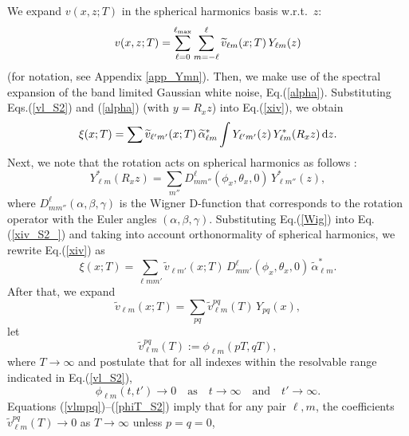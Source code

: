 \documentclass[12pt]{article}
\renewcommand{\d}{{\rm d}}
\newcommand{\wrt}{w.r.t.\ }
\begin{document}
We expand $v(x,z;T)$ in the spherical harmonics basis \wrt $z$:
%
\begin {equation}
\label{vl_S2}
v(x,z;T) = \sum^{\ell_{\rm max}}_{\ell=0} \sum^\ell_{m=-\ell} \widetilde v_{\ell m}(x;T) \, Y_{\ell m} (z)
\end {equation}
%
(for notation, see Appendix \ref{app_Ymn}).
Then, we make use of the spectral expansion of the
band limited Gaussian white noise, Eq.(\ref{alpha}).
Substituting  Eqs.(\ref{vl_S2}) and (\ref{alpha}) (with $y=R_x z$) into Eq.(\ref{xiv}), we obtain
%
\begin {equation}
\label{xiv_S2_}
\xi(x;T) = \sum \widetilde v_{\ell' m'}(x;T)\,\widetilde\alpha_{\ell m} ^*
  \int   Y_{\ell' m'} (z)\, Y_{\ell m}^*(R_x z)   \, \d z.
\end {equation}
%
Next, we note that the rotation acts on  spherical harmonics as follows \citep[][sec. 5.5.1]{Varshalovich}:
%
\begin {equation}
\label{Wig}
Y_{\ell m}^*(R_x z) = 
  \sum_{m''} D^{\ell}_{mm''}(\phi_x, \theta_x, 0) \, Y_{\ell m''}^*(z),
\end {equation}
%
where $D^{\ell}_{mm''}(\alpha, \beta, \gamma)$ is the Wigner D-function that
corresponds to the rotation operator with the Euler angles $(\alpha, \beta, \gamma)$.
Substituting  Eq.(\ref{Wig}) into Eq.(\ref{xiv_S2_}) 
and taking into account orthonormality of spherical harmonics, we rewrite  Eq.(\ref{xiv}) as 
%
\begin {equation}
\label{xiv_S2}
\xi(x;T) = \sum_{\ell mm'} \widetilde v_{\ell m'}(x;T)\, D^{\ell}_{mm'}(\phi_x, \theta_x, 0)  \,\widetilde\alpha_{\ell m}^*.
\end {equation}
%
After that, we expand
%
\begin {equation}
\label{vlp_S2}
\widetilde v_{\ell m}(x;T) = \sum_{pq} \widetilde v_{\ell m}^{pq}(T) \, Y_{pq} (x),
\end {equation}
%
let
%
\begin {equation}
\label{vlmpq}
\widetilde v_{\ell m}^{pq}(T) := \phi_{\ell m}(pT, qT),
\end {equation}
%
where $T\to\infty$   and postulate that for all indexes within the resolvable range indicated in Eq.(\ref{vl_S2}),
%
\begin {equation}
\label{phiT_S2}
\phi_{\ell m}(t, t')\to 0 \quad \mbox{as} \quad t\to\infty \quad \mbox{and} \quad  t'\to\infty. 
\end {equation}
%
Equations (\ref{vlmpq})--(\ref{phiT_S2})  imply that for any pair $\ell,m$, the coefficients  
$\widetilde v_{\ell m}^{pq}(T) \to 0$ as $T \to \infty$ unless $p=q=0$,
\end{document}
